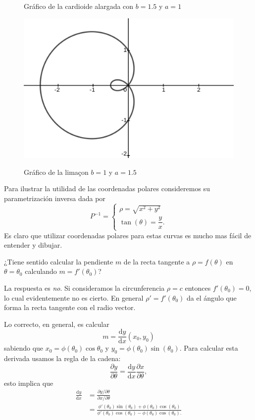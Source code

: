 \documentclass[mid,fleqn,draft,twoside]{notasdeclase}
\newcommand{\inv}{^{-1}}
\newcommand{\pdd}[2]{\dfrac{\partial #1}{\partial #2}}
\begin{document}
\begin{ejem}[cardioides]
\begin{minipage}{.32\linewidth}
\begin{figure}[H]
		\caption{Gráfico de la cardioide alargada con $b=1.5$ y $a=1$}\label{ch0g4}
	\end{figure}
\end{minipage}
\begin{minipage}{.32\linewidth}
	\begin{figure}[H]\centering
		\includegraphics[width=1\linewidth]{pics/c3}\\ 
		\caption{Gráfico de la lima\c con $b=1$ y $a=1.5$}\label{ch0g5}
	\end{figure}
\end{minipage}
\end{ejem}
Para ilustrar la utilidad de las coordenadas polares consideremos su parametrización inversa dada por
\[ P\inv=\begin{cases}
\rho = \sqrt{x^2+y^2} \\[.3em]
\tan(\theta) = \dfrac{y}{x}. 
\end{cases} \]
Es claro que utilizar coordenadas polares para estas curvas es mucho mas fácil de entender y dibujar.


¿Tiene sentido calcular la pendiente $m$ de la recta tangente a $\rho = f(\theta)$ en $\theta=\theta_0$ calculando $m = f'(\theta_0)$?

La respuesta es \emph{no}. Si consideramos la circunferencia $\rho = c$ entonces $f'(\theta_0)=0$, lo cual evidentemente no es cierto. En general $\rho'=f'(\theta_0)$ da el ángulo que forma la recta tangente con el radio vector. 

Lo correcto, en general, es calcular 
\[ m=\frac{\mathrm dy}{\mathrm dx}(x_0,y_0) \]
sabiendo que $x_0=\phi(\theta_0)\cos\theta_0$ y $y_0=\phi(\theta_0)\sin(\theta_0)$. Para calcular esta derivada usamos la regla de la cadena:
\[ \pdd{y}{\theta} = \frac{\mathrm dy}{\mathrm dx}\pdd{x}{\theta}, \]
esto implica que
\begin{align*}
\frac{\mathrm dy}{\mathrm dx} &= \frac{\partial y/\partial\theta}{\partial x/\partial\theta} \\
&= \frac{\phi'(\theta_0)\sin(\theta_0) + \phi(\theta_0)\cos(\theta_0)}{\phi'(\theta_0)\cos(\theta_0) - \phi(\theta_0)\cos(\theta_0).}
\end{align*}
\end{document}
